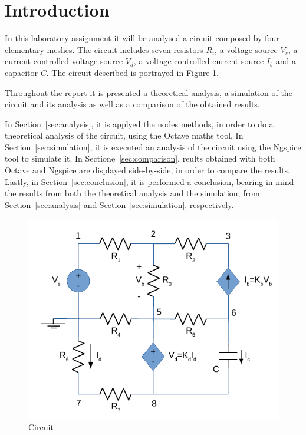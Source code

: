\section{Introduction}
\label{sec:introduction}

In this laboratory assignment it will be analysed a circuit composed by four
elementary meshes. The circuit includes seven resistors $R_i$, a voltage source
$V_s$, a current controlled voltage source $V_d$, a voltage controlled current
source $I_b$ and a capacitor $C$. The circuit described is portrayed in
Figure-\ref{fig:circuit}.

Throughout the report it is presented a theoretical analysis, a simulation of the
circuit and its analysis as well as a comparison of the obtained results. \par
In Section~\ref{sec:analysis},  it is applyed the nodes methods, in order to do
a theoretical analysis of the circuit, using the Octave maths tool.
In Section~\ref{sec:simulation}, it is executed an analysis of the circuit using
the Ngspice tool to simulate it.
In Sectione~\ref{sec:comparison}, reults obtained with both Octave and Ngspice are
displayed side-by-side, in order to compare the results.
Lastly, in Section~\ref{sec:conclusion}, it is performed a conclusion, bearing in mind the
results from both the theoretical analysis and the simulation, from Section~\ref{sec:analysis}
and Section~\ref{sec:simulation}, respectively.


\begin{figure}[H] \centering
\includegraphics[width=0.7\linewidth]{circuit.pdf}
\caption{Circuit}
\label{fig:circuit}
\end{figure}

\newpage

